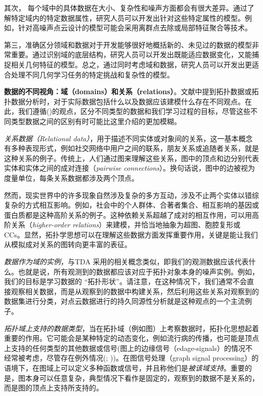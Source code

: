 \documentclass[
  12pt,
]{krantz}
\begin{document}
其次，
每个域中的具体数据在大小、复杂性和噪声方面都会有很大差异。通过了解特定域内的特定数据属性，研究人员可以开发出针对这些特定属性的模型。例如，针对高噪声点云设计的模型可能会采用离群点去除或局部特征聚合等技术。

第三，准确区分领域和数据对于开发能够很好地概括新的、未见过的数据的模型非常重要。通过识别域的底层结构，研究人员可以开发出既能适应数据变化，又能捕捉相关几何特征的模型。总之，通过同时考虑域和数据，研究人员可以开发出更适合处理不同几何学习任务的特定挑战和复杂性的模型。

\textbf{数据的不同视角：域（domains）和关系（relations）}。文献中提到拓扑数据或拓扑数据分析时，对于实际数据包括什么以及数据应该建模什么存在不同观点。在此，我们遵循()的观点，区分不同类型的数据和我们学习过程的目标，尽管这些不同类型数据之间的区别有时可能比这里介绍的更加模糊。

\emph{关系数据（Relational
data）}，用于描述不同实体或对象间的关系，这一基本概念有多种表现形式，例如社交网络中用户之间的联系，朋友关系或追随者关系，就是这种关系的例子。传统上，人们通过图来理解这些关系，图中的顶点和边分别代表实体和实体之间的成对连接（\emph{pairwise
connections}）。换句话说，图中的边被视为度量单位，每条关系数据都涉及两个顶点。

然而，现实世界中的许多现象自然涉及复杂的多方互动，涉及不止两个实体以错综复杂的方式相互影响。例如，社会中的个人群体、合著者集合、相互影响的基因或蛋白质都是这种高阶关系的例子。这种依赖关系超越了成对的相互作用，可以用高阶关系（\emph{higher-order
relations}）来建模，并恰当地抽象为超图、胞腔复形或
CCs。显然，拓扑学思想可以在理解这些数据方面发挥重要作用，关键是能让我们从模拟成对关系的图转向更丰富的表征。

\emph{数据作为域的实例}，与TDA
采用的相关概念类似，即我们的观测数据应该代表什么。也就是说，所有观测到的数据都应该对应于拓扑对象本身的噪声实例。例如，我们的目标是学习数据的
``拓扑形状''。请注意，在这种情况下，我们通常不会直接观察相关数据，而是从观察到的数据中构建关系，然后利用这些关系对观察到的数据集进行分类，对点云数据进行的持久同源性分析就是这种观点的一个主流例子。

\emph{拓扑域上支持的数据类型}，当在拓扑域（例如图）上考察数据时，拓扑化思想起着重要的作用。它可能会是某种特定的动态变化，例如流行病的传播，也可能是顶点上支持的任何类型的其他数据或信号(图上的边缘信号（edage-signals）的情况不经常被考虑，尽管存在例外情况(; ))。在图信号处理（graph signal
processing）的语境下，在图域上可以定义多种函数或信号，并且称他们是\emph{被该域支持}。重要的是，图本身可以任意复杂，典型情况下看作是固定的，观察到的数据不是关系的，而是图的顶点上支持所支持的。
\end{document}
